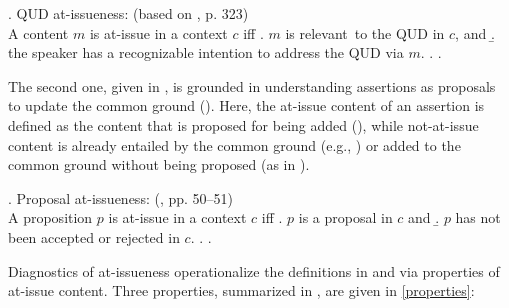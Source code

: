 \documentclass[times,linguex]{glossa}
\begin{document}
\ex. \label{def:qai}%
QUD at-issueness: \hfill (based on \citealt{simons_what_2010}, p. 323)\\
A content $m$ is at-issue in a context $c$ iff
\a. \label{def:qai-relevant}%
$m$ is relevant\footnotemark\ to the QUD in $c$, and
\b.  \label{def:qai-conventional}%
the speaker has a recognizable intention to address the QUD via $m$.
\z. 
\z.


The second one, given in \Next, is grounded in understanding assertions as proposals to update the common ground (\citealt{stalnaker_assertion_1978,clark_contributing_1989,ginzburg_resolving_1995,farkas_reacting_2010}). Here, the at-issue content of an assertion is defined as the content that is proposed for being added (\citealt{murray_evidentiality_2010,murray_varieties_2014,anderbois_crossing_2010,anderbois_at-issue_2015,koev_apposition_2013}), while not-at-issue content is already entailed by the common ground (e.g., \citealt{stalnaker_presuppositions_1973,stalnaker_common_2002}) or added to the common ground without being proposed (as in \citealt{murray_evidentiality_2010,murray_varieties_2014,anderbois_crossing_2010,anderbois_at-issue_2015}).

\ex. \label{def:proposal}%
Proposal at-issueness: \hfill (\citealt{koev_apposition_2013}, pp. 50--51)\\
A proposition $p$ is at-issue in a context $c$ iff
\a. $p$ is a proposal in $c$ and
\b. $p$ has not been accepted or rejected in $c$.
\z.
\z.


Diagnostics of at-issueness operationalize the definitions in \LLast and \Last via properties of at-issue content. Three properties, summarized in \citealt{tonhauser_diagnosing_2012}, are given in \ref{properties}: 
\end{document}
